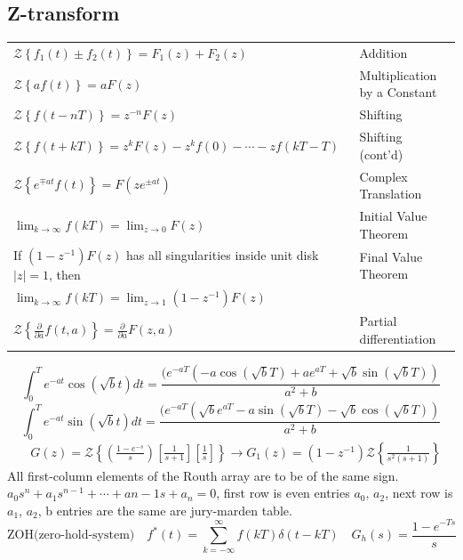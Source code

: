 \begin{multicols}{2}

\subsection{Z-transform}
\begin{tabular}{p{7.75cm} p{4.75cm}}
$\mathcal{Z} \left\{ f_1(t) \pm f_2(t) \right\}=F_1(z)+F_2(z)$ & Addition\\
$\mathcal{Z} \left\{ af(t) \right\}= aF(z)$ & Multiplication by a Constant \\
$\mathcal{Z} \left\{ f(t-nT) \right\}=z^{-n}F(z)$ & Shifting \\
$\mathcal{Z} \left\{ f(t+kT) \right\}=z^{k}F(z)-z^{k}f(0)- \cdots - z f(kT-T)$ & Shifting (cont'd)\\
$\mathcal{Z} \left\{ e^{\mp at} f(t) \right\}=F(ze^{\pm at})$ & Complex Translation \\
$\lim_{k \rightarrow \infty} f(kT)= \lim_{z \rightarrow 0}F(z)$ & Initial Value Theorem \\ \hline
If $(1-z^{-1})F(z)$ has all singularities inside unit disk $|z|=1$, then & Final Value Theorem \\
$\lim_{k \rightarrow \infty} f(kT) = \lim_{z \rightarrow 1} (1-z^{-1})F(z)$ & \\
$\mathcal{Z} \left\{ \frac{\partial}{\partial a} f(t,a) \right\} = \frac{\partial}{\partial a} F(z,a)$& Partial differentiation
\end{tabular}

$$ \int_0^T e^{-a t} \cos(\sqrt{b}t) dt = \frac{(e^{-a T} (-a \cos(\sqrt{b} T) + a e^{a T} + \sqrt{b} \sin(\sqrt{b}T))}{a^2 + b}$$
$$ \int_0^T e^{-a t} \sin(\sqrt{b}t) dt = \frac{(e^{-a T} (\sqrt{b} e^{aT}- a \sin(\sqrt{b} T) - \sqrt{b} \cos(\sqrt{b}T))}{a^2 + b}$$
\begin{align*}
& G(z) = \mathcal{Z} \left\{\left(\frac{1-e^{-s}}{s}\right) \left[ \frac{1}{s+1}\right] \left[\frac{1}{s}\right] \right\} \rightarrow G_1(z) = (1-z^{-1})\mathcal{Z} \left\{ \frac{1}{s^2(s+1)} \right\}
\end{align*}
All first-column elements of the Routh array are to be of the same sign. $a_0s^n + a_1s^{n-1}+ \cdots + a{n-1} s + a_n = 0$, first row is even entries $a_0$, $a_2$, next row is $a_1$, $a_2$, b entries are the same are jury-marden table.
$$ \text{ZOH(zero-hold-system)} \quad 
f^\ast(t) = \sum_{k=-\infty}^\infty f(kT)\delta(t-kT)  \quad 
G_{h}(s)= \frac{1-e^{-Ts}}{s}
$$

\end{multicols}
